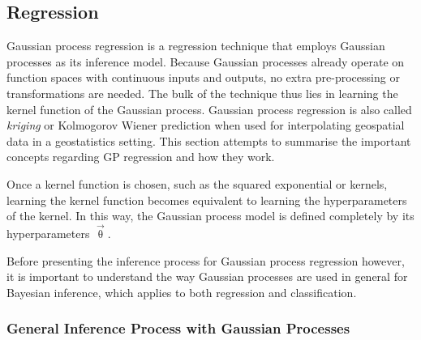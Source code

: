 		\subsection{Regression}
		\label{Background:GaussianProcesses:Regression}
		
			Gaussian process regression is a regression technique that employs Gaussian processes as its inference model. Because Gaussian processes already operate on function spaces with continuous inputs and outputs, no extra pre-processing or transformations are needed. The bulk of the technique thus lies in learning the kernel function of the Gaussian process. Gaussian process regression is also called \textit{kriging} or Kolmogorov Wiener prediction when used for interpolating geospatial data in a geostatistics setting. This section attempts to summarise the important concepts regarding GP regression and how they work.
			
			Once a kernel function is chosen, such as the squared exponential or \matern kernels, learning the kernel function becomes equivalent to learning the hyperparameters of the kernel. In this way, the Gaussian process model is defined completely by its hyperparameters $\vec{\uptheta}$. %
			
			Before presenting the inference process for Gaussian process regression however, it is important to understand the way Gaussian processes are used in general for Bayesian inference, which applies to both regression and classification.
			
			\subsubsection{General Inference Process with Gaussian Processes}
			\label{Background:GaussianProcess:Regression:GeneralGaussianProcessInferece}
			
